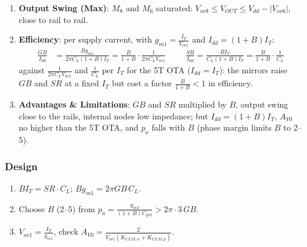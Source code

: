 \begin{enumerate}
    \paragraph{At Input:} \(I_G = 0\): \(Z_{in} \to \infty\) at DC.
    \paragraph{At Output:} \(V_{id} = 0\) holds \(V_b = V_c = 0\): \(Z_{out} = \frac{1}{g_{o6} + g_{o8}} = r_{o6} \parallel r_{o8}\).
  \item \textbf{Output Swing (Max)}: \(M_8\) and \(M_6\) saturated:
    \(V_{ov8} \leq V_{OUT} \leq V_{dd} - |V_{ov6}|\), close to rail to rail.
  \item \textbf{Efficiency}: per supply current, with \(g_{m1} = \frac{I_T}{V_{ov1}}\) and \(I_{dd} = (1 + B)I_T\):
    \begin{align*}
      \frac{GB}{I_{dd}} &= \frac{B g_{m1}}{2\pi C_L (1 + B) I_T} = \frac{B}{1 + B}\cdot\frac{1}{2\pi C_L V_{ov1}} \hspace{1cm}
      \frac{SR}{I_{dd}} = \frac{B I_T}{C_L(1 + B) I_T} = \frac{B}{1 + B}\cdot\frac{1}{C_L}
    \end{align*}
    against \(\frac{1}{2\pi C_L V_{ov1}}\) and \(\frac{1}{C_L}\) per \(I_T\) for the 5T OTA (\(I_{dd} = I_T\)): the mirrors raise \(GB\) and \(SR\) at a
    fixed \(I_T\) but cost a factor \(\frac{B}{1 + B} < 1\) in efficiency.
  \item \textbf{Advantages \& Limitations}: \(GB\) and \(SR\) multiplied by \(B\), output swing close to
    the rails, internal nodes low impedance; but \(I_{dd} = (1 + B) I_T\), \(A_{V0}\) no higher than the 5T
    OTA, and \(p_a\) falls with \(B\) (phase margin limits \(B\) to 2--5).
\end{enumerate}

\subsubsection{Design}
\begin{enumerate}
  \item \(B I_T = SR \cdot C_L\); \(B g_{m1} = 2\pi GB\, C_L\).
  \item Choose \(B\) (2--5) from \(p_a = \frac{g_{m3}}{(1 + B) C_{gs3}} > 2\pi \cdot 3\,GB\).
  \item \(V_{ov1} = \frac{I_T}{g_{m1}}\), check \(A_{V0} = \frac{2}{V_{ov1}(K_{CLM,n} + K_{CLM,p})}\).
\end{enumerate}

